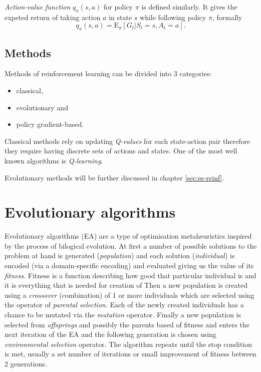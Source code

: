 \emph{Action-value function} $q_\pi(s,a)$ for policy $\pi$ is defined similarly. It gives the expeted return of taking action $a$ in state $s$ while following policy $\pi$, formally
\begin{equation}
    q_\pi(s,a) = \mathrm{E}_\pi[G_t|S_t=s, A_t=a].
\end{equation}\cite{Sutton1998}
\subsection{Methods}
Methods of reinforcement learning can be divided into 3 categories: \begin{itemize}
    \item classical,
    \item evolutionary and
    \item policy gradient-based.
\end{itemize}

Classical methods rely on updating \emph{Q-values} for  each state-action pair therefore they require having discrete sets of actions and states. One of the most well known algorithms is \emph{Q-learning}.

Evolutionary methods will be further discussed in chapter \ref{sec:es-reinf}.

\section{Evolutionary algorithms}
\label{sec:ea}
Evolutionary algorithms (EA) are a type of optimisation metaheuristics inspired by the process of bilogical evolution. At first a number of possible solutions to the problem at hand is generated (\emph{population}) and each solution (\emph{individual}) is encoded (via a domain-specific encoding) and evaluated giving us the value of its \emph{fitness}. Fitness is a function describing how good that particular individual is and it is everything that is needed for creation of  Then a new population is created using a \emph{crossover} (combination) of 1 or more individuals which are selected using the operator of \emph{parental selection}. Each of the newly created individuals has a chance to be mutated via the \emph{mutation} operator. Finally a new population is selected from \emph{offsprings} and possibly the parents based of fitness and enters the next iteration of the EA and the following generation is chosen using \emph{environmental selection} operator. The algorithm repeats until the stop condition is met, usually a set number of iterations or small improvement of fitness between 2 generations. 

